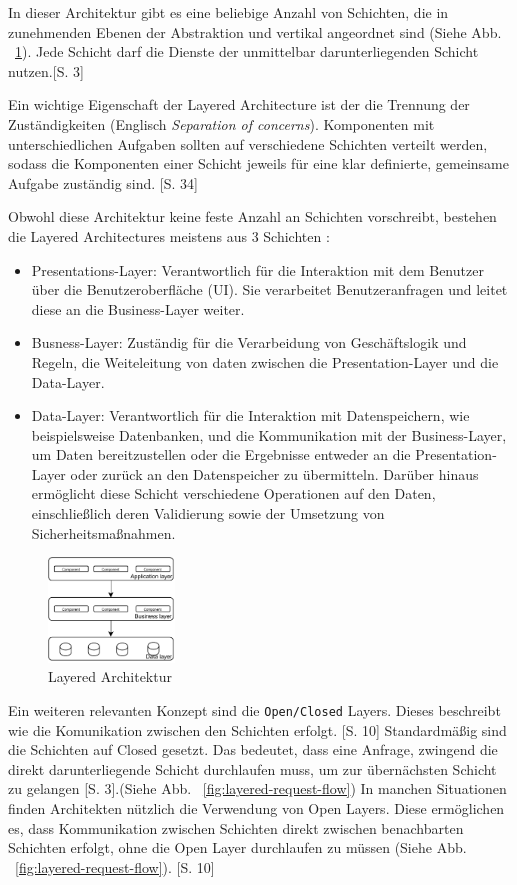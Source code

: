 \documentclass[acmtog]{acmart}
\begin{document}
In dieser Architektur gibt es eine beliebige Anzahl von Schichten, die in zunehmenden Ebenen 
der Abstraktion und vertikal angeordnet sind (Siehe Abb. ~\ref{fig:layered}). 
Jede Schicht darf die Dienste der unmittelbar darunterliegenden Schicht nutzen.\cite{layered3}[S. 3]

Ein wichtige Eigenschaft der Layered Architecture ist der die Trennung der Zuständigkeiten 
(Englisch \textit{Separation of concerns}). Komponenten mit unterschiedlichen Aufgaben sollten 
auf verschiedene Schichten verteilt werden, sodass die Komponenten einer Schicht jeweils für 
eine klar definierte, gemeinsame Aufgabe zuständig sind. \cite {layered2}[S. 34]

Obwohl diese Architektur keine feste Anzahl an Schichten vorschreibt, 
bestehen die Layered Architectures meistens aus 3 Schichten \cite {layered2}:
\begin{itemize}
\item Presentations-Layer: Verantwortlich für die Interaktion mit dem Benutzer über die Benutzeroberfläche (UI). 
  Sie verarbeitet Benutzeranfragen und leitet diese an die Business-Layer weiter.
\item Busness-Layer: Zuständig für die Verarbeidung von Geschäftslogik und Regeln, die Weiteleitung von daten zwischen 
  die Presentation-Layer und die Data-Layer.
\item Data-Layer: Verantwortlich für die Interaktion mit Datenspeichern, wie beispielsweise Datenbanken,
  und die Kommunikation mit der Business-Layer, um Daten bereitzustellen oder die Ergebnisse entweder an die Presentation-Layer
  oder zurück an den Datenspeicher zu übermitteln. Darüber hinaus ermöglicht diese Schicht verschiedene Operationen auf den Daten,
  einschließlich deren Validierung sowie der Umsetzung von Sicherheitsmaßnahmen.
\end{itemize}

\begin{figure}[h!]
    \centering
    \includegraphics[width=0.3\textwidth]{images/layer.pdf}
    \caption{Layered Architektur}
    \label{fig:layered}
\end{figure}

Ein weiteren relevanten Konzept sind die \texttt{Open/Closed} Layers. Dieses beschreibt wie die 
Komunikation zwischen den Schichten erfolgt. \cite{layered4}[S. 10]
Standardmäßig sind die Schichten auf Closed gesetzt. Das bedeutet, dass eine Anfrage, 
zwingend die direkt darunterliegende Schicht durchlaufen muss, um zur übernächsten Schicht zu gelangen \cite{layered}[S. 3].(Siehe Abb. ~\ref{fig:layered-request-flow})
In manchen Situationen finden Architekten nützlich die Verwendung von Open Layers. Diese ermöglichen 
es, dass Kommunikation zwischen Schichten direkt zwischen benachbarten Schichten erfolgt, ohne die 
Open Layer durchlaufen zu müssen  (Siehe Abb. ~\ref{fig:layered-request-flow}). \cite{layered4}[S. 10]
\end{document}
